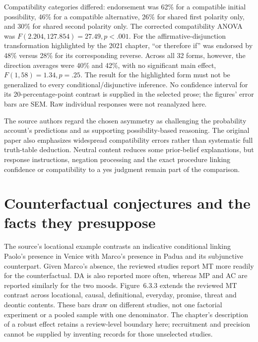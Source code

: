 Compatibility categories differed: endorsement was 62\% for a
compatible initial possibility, 46\% for a compatible alternative,
26\% for shared first polarity only, and 30\% for shared second
polarity only. The corrected compatibility ANOVA was
\(F(2.204,127.854)=27.49,p<.001\).
For the affirmative-disjunction transformation highlighted by the
2021 chapter, ``or therefore if'' was endorsed by 48\% versus
28\% for its corresponding reverse. Across all 32 forms, however,
the direction averages were 40\% and 42\%, with no significant
main effect, \(F(1,58)=1.34,p=.25\). The result for the highlighted
form must not be generalized to every conditional/disjunctive inference.
No confidence interval for its 20-percentage-point contrast is supplied
in the selected prose; the figures' error bars are SEM. Raw individual
responses were not reanalyzed here.

The source authors regard the chosen asymmetry as challenging the
probability account's predictions and as supporting possibility-based
reasoning. The original paper also emphasizes widespread compatibility
errors rather than systematic full truth-table deduction. Neutral
content reduces some prior-belief explanations, but response instructions,
negation processing and the exact procedure linking confidence or
compatibility to a yes judgment remain part of the comparison.

\section{Counterfactual conjectures and the facts they presuppose}
\label{sec:p19-rat63-counterfactuals}

The source's locational example contrasts an indicative conditional
linking Paolo's presence in Venice with Marco's presence in Padua and
its subjunctive counterpart. Given Marco's absence, the reviewed studies
report MT more readily for the counterfactual. DA is also reported more
often, whereas MP and AC are reported similarly for the two moods.
Figure~6.3.3 extends the reviewed MT contrast across locational, causal,
definitional, everyday, promise, threat and deontic contents. These
bars draw on different studies, not one factorial experiment or a pooled
sample with one denominator. The chapter's description of a robust
effect retains a review-level boundary here; recruitment and precision
cannot be supplied by inventing records for those unselected studies.
\cite[Sec.~3.1, pp.~410--413]{ByrneEspino2021ConditionalCounterfactual}

